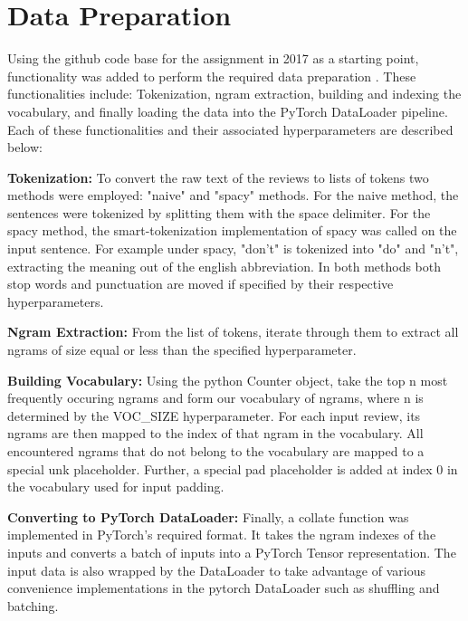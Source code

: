 \documentclass[a4paper,10pt]{article}
\begin{document}
\section{Data Preparation}
\par
\justify
Using the github code base for the assignment in 2017 as a starting point, functionality was added to perform the required data preparation \cite{repo2017}. These functionalities include: Tokenization, ngram extraction, building and indexing the vocabulary, and finally loading the data into the PyTorch DataLoader pipeline. Each of these functionalities and their associated hyperparameters are described below:

\par
\justify
\textbf{Tokenization:} To convert the raw text of the reviews to lists of tokens two methods were employed: "naive" and "spacy" methods. For the naive method, the sentences were tokenized by splitting them with the space delimiter. For the spacy method, the smart-tokenization implementation of spacy was called on the input sentence. For example under spacy, "don't" is tokenized into "do" and "n't", extracting the meaning out of the english abbreviation. In both methods both stop words and punctuation are moved if specified by their respective hyperparameters.

\par
\justify
\textbf{Ngram Extraction:} From the list of tokens, iterate through them to extract all ngrams of size equal or less than the specified hyperparameter. 

\par
\justify
\textbf{Building Vocabulary:} Using the python Counter object, take the top n most frequently occuring ngrams and form our vocabulary of ngrams, where n is determined by the VOC\_SIZE hyperparameter. For each input review, its ngrams are then mapped to the index of that ngram in the vocabulary. All encountered ngrams that do not belong to the vocabulary are mapped to a special \textlangle{}unk\textrangle{} placeholder. Further, a special \textlangle{}pad\textrangle{} placeholder is added at index 0 in the vocabulary used for input padding.

\par
\justify
\textbf{Converting to PyTorch DataLoader:} Finally, a collate function was implemented in PyTorch's required format. It takes the ngram indexes of the inputs and converts a batch of inputs into a PyTorch Tensor representation. The input data is also wrapped by the DataLoader to take advantage of various convenience implementations in the pytorch DataLoader such as shuffling and batching.
\end{document}
